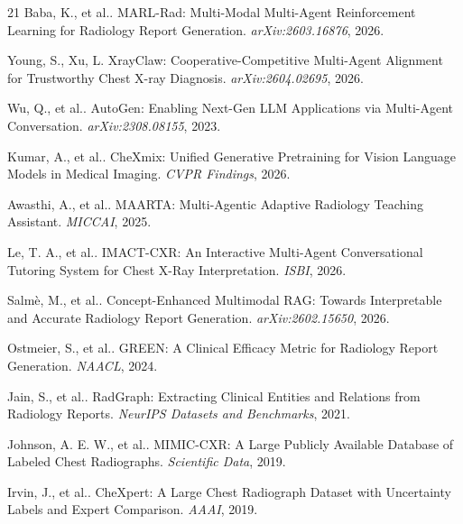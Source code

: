 \documentclass[runningheads,10pt]{llncs}
\begin{document}
\begin{thebibliography}{21}
 Baba, K., et al.. MARL-Rad: Multi-Modal Multi-Agent Reinforcement Learning for Radiology Report Generation. \emph{arXiv:2603.16876}, 2026.

 Young, S., Xu, L. XrayClaw: Cooperative-Competitive Multi-Agent Alignment for Trustworthy Chest X-ray Diagnosis. \emph{arXiv:2604.02695}, 2026.

 Wu, Q., et al.. AutoGen: Enabling Next-Gen LLM Applications via Multi-Agent Conversation. \emph{arXiv:2308.08155}, 2023.

 Kumar, A., et al.. CheXmix: Unified Generative Pretraining for Vision Language Models in Medical Imaging. \emph{CVPR Findings}, 2026.

 Awasthi, A., et al.. MAARTA: Multi-Agentic Adaptive Radiology Teaching Assistant. \emph{MICCAI}, 2025.

 Le, T. A., et al.. IMACT-CXR: An Interactive Multi-Agent Conversational Tutoring System for Chest X-Ray Interpretation. \emph{ISBI}, 2026.

 Salm\`{e}, M., et al.. Concept-Enhanced Multimodal RAG: Towards Interpretable and Accurate Radiology Report Generation. \emph{arXiv:2602.15650}, 2026.

 Ostmeier, S., et al.. GREEN: A Clinical Efficacy Metric for Radiology Report Generation. \emph{NAACL}, 2024.

 Jain, S., et al.. RadGraph: Extracting Clinical Entities and Relations from Radiology Reports. \emph{NeurIPS Datasets and Benchmarks}, 2021.

 Johnson, A. E. W., et al.. MIMIC-CXR: A Large Publicly Available Database of Labeled Chest Radiographs. \emph{Scientific Data}, 2019.

 Irvin, J., et al.. CheXpert: A Large Chest Radiograph Dataset with Uncertainty Labels and Expert Comparison. \emph{AAAI}, 2019.

\end{thebibliography}
\end{document}
